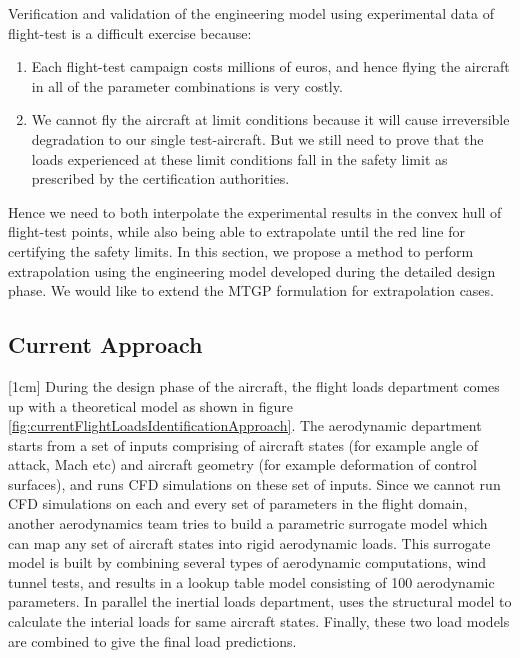 Verification and validation of the engineering model using experimental data of flight-test is a difficult exercise because:
\begin{enumerate}
\item Each flight-test campaign costs millions of euros, and hence flying the aircraft in all of the parameter combinations is very costly.
\item We cannot fly the aircraft at limit conditions because it will cause irreversible degradation to our single test-aircraft. But we still need to prove that the loads experienced at these limit conditions fall in the safety limit as prescribed by the certification authorities.
\end{enumerate}

Hence we need to both interpolate the experimental results in the convex hull of flight-test points, while also being able to extrapolate until the red line for certifying the safety limits. In this section, we propose a method to perform extrapolation using the engineering model developed during the detailed design phase. We would like to extend the MTGP formulation for extrapolation cases. 

\subsection{Current Approach}
[1cm]
During the design phase of the aircraft, the flight loads department comes up with a theoretical model as shown in figure \ref{fig:currentFlightLoadsIdentificationApproach}. The aerodynamic department starts from a set of inputs comprising of aircraft states (for example angle of attack, Mach etc) and aircraft geometry (for example deformation of control surfaces), and runs CFD simulations on these set of inputs. Since we cannot run CFD simulations on each and every set of parameters in the flight domain, another aerodynamics team tries to build a parametric surrogate model which can map any set of aircraft states into rigid aerodynamic loads. This surrogate model is built by combining several types of aerodynamic computations, wind tunnel tests, and results in a lookup table model consisting of 100 aerodynamic parameters. In parallel the inertial loads department, uses the structural model to calculate the interial loads for same aircraft states. Finally, these two load models are combined to give the final load predictions. 


